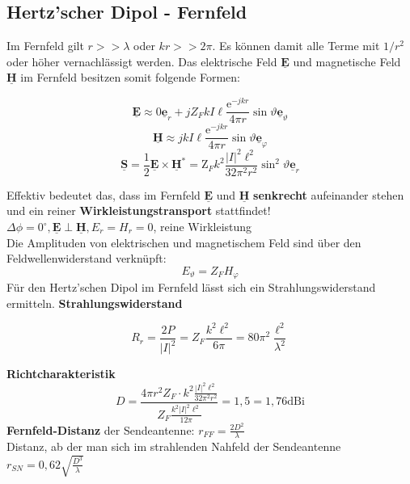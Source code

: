 \documentclass[english]{latex4ei/latex4ei_sheet}
\renewcommand{\vec}[1]{\underline{\boldsymbol{#1}}}
\begin{document}
\begin{sectionbox}
    \subsection{Hertz'scher Dipol - Fernfeld}
    Im Fernfeld gilt $r >> \lambda$ oder $kr >> 2\pi$. Es können damit alle Terme mit $1/r^2$ oder höher vernachlässigt werden. Das elektrische Feld $\vec{E}$ und magnetische Feld $\vec{H}$ im Fernfeld besitzen somit folgende Formen:
    \begin{emphbox}
        $$
            \vec{E} \approx 0 \vec{e}_{r}+j Z_{F} k I \ell \frac{\mathrm{e}^{-j k r}}{4 \pi r} \sin \vartheta \vec{e}_{\vartheta}
        $$
        $$
            \vec{H} \approx j k I \ell \frac{\mathrm{e}^{-j k r}}{4 \pi r} \sin \vartheta \vec{e}_{\varphi}
        $$
        $$
            \vec{S}=\frac{1}{2} \vec{E} \times \vec{H}^{*}=\mathrm{Z}_{F} k^{2} \frac{|I|^{2} \ell^{2}}{32 \pi^{2} r^{2}} \sin ^{2} \vartheta \vec{e}_{r}
        $$
    \end{emphbox}
    Effektiv bedeutet das, dass im Fernfeld $\vec{E}$ und $\vec{H}$ \textbf{senkrecht} aufeinander stehen und ein reiner \textbf{Wirkleistungstransport} stattfindet!\\
    $\Delta \phi=0^{\circ}, \vec{E} \perp \vec{H}, E_{r}=H_{r}=0$, reine Wirkleistung\\
    Die Amplituden von elektrischen und magnetischem Feld sind über den Feldwellenwiderstand verknüpft:
    $$
        E_{\vartheta}=Z_{F} H_{\varphi}
    $$
    Für den Hertz'schen Dipol im Fernfeld lässt sich ein Strahlungswiderstand ermitteln.
    \textbf{Strahlungswiderstand}
    \begin{emphbox}
        $$
            R_{r}=\frac{2 P}{|I|^{2}}=Z_{F} \frac{k^{2} \ell^{2}}{6 \pi}=80 \pi^{2} \frac{\ell^{2}}{\lambda^{2}}
        $$
    \end{emphbox}
    \textbf{Richtcharakteristik}
    $$
        D=\frac{4 \pi r^{2} Z_{F} \cdot k^{2} \frac{|I|^{2} \ell^{2}}{32 \pi^{2} r^{2}}}{Z_{F} \frac{k^{2}|I|^{2} \ell^{2}}{12 \pi}}=1,5=1,76 \mathrm{dBi}
    $$
    \textbf{Fernfeld-Distanz} der Sendeantenne: $r_{FF} = \frac{2D^2}{\lambda}$\\
    Distanz, ab der man sich im strahlenden Nahfeld der Sendeantenne $r_{SN} = 0,62\sqrt{\frac{D^3}{\lambda}}$
\end{sectionbox}
\end{document}
